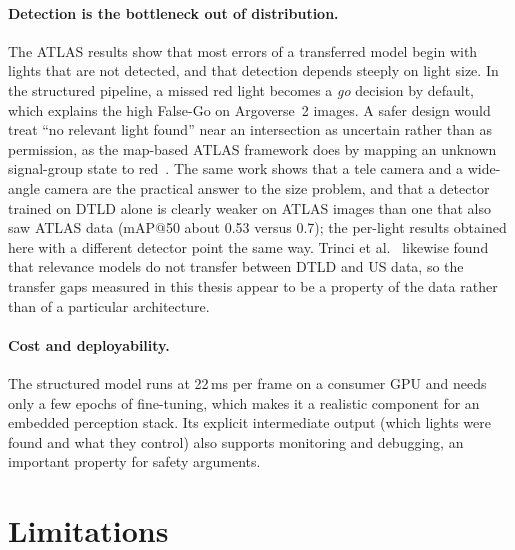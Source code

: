 \paragraph{Detection is the bottleneck out of distribution.} The ATLAS results show that most errors of a
transferred model begin with lights that are not detected, and that detection depends steeply on light
size. In the structured pipeline, a missed red light becomes a \emph{go} decision by default, which
explains the high False-Go on Argoverse~2 images. A safer design would treat ``no relevant light
found'' near an intersection as uncertain rather than as permission, as the map-based ATLAS framework
does by mapping an unknown signal-group state to red~\cite{polley2025atlas}. The same work shows that a
tele camera and a wide-angle camera are the practical answer to the size problem, and that a detector
trained on DTLD alone is clearly weaker on ATLAS images than one that also saw ATLAS data (mAP@50 about
0.53 versus 0.7); the per-light results obtained
here with a different detector point the same way. Trinci et al.~\cite{trinci2026color} likewise found
that relevance models do not transfer between DTLD and US data, so the transfer gaps measured in this
thesis appear to be a property of the data rather than of a particular architecture.

\paragraph{Cost and deployability.} The structured model runs at 22\,ms per frame on a consumer GPU and
needs only a few epochs of fine-tuning, which makes it a realistic component for an embedded perception
stack. Its explicit intermediate output (which lights were found and what they control) also supports
monitoring and debugging, an important property for safety arguments.

\section{Limitations}
\label{sec:disc-limits}

